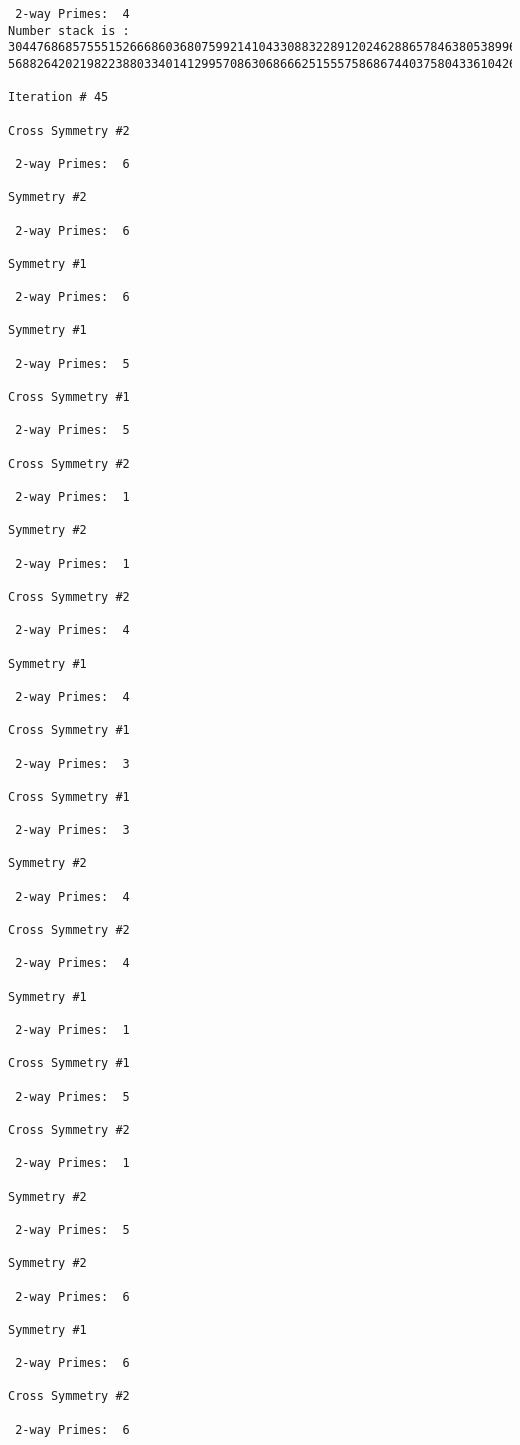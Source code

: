 {{{{\begin{verbatim}
 2-way Primes: 	4
Number stack is :
30447686857555152666860368075992141043308832289120246288657846380538996794608835958544046240163340857
56882642021982238803340141299570863068666251555758686744037580433610426404458595388064976998350836487

Iteration #	45

Cross Symmetry #2

 2-way Primes: 	6

Symmetry #2

 2-way Primes: 	6

Symmetry #1

 2-way Primes: 	6

Symmetry #1

 2-way Primes: 	5

Cross Symmetry #1

 2-way Primes: 	5

Cross Symmetry #2

 2-way Primes: 	1

Symmetry #2

 2-way Primes: 	1

Cross Symmetry #2

 2-way Primes: 	4

Symmetry #1

 2-way Primes: 	4

Cross Symmetry #1

 2-way Primes: 	3

Cross Symmetry #1

 2-way Primes: 	3

Symmetry #2

 2-way Primes: 	4

Cross Symmetry #2

 2-way Primes: 	4

Symmetry #1

 2-way Primes: 	1

Cross Symmetry #1

 2-way Primes: 	5

Cross Symmetry #2

 2-way Primes: 	1

Symmetry #2

 2-way Primes: 	5

Symmetry #2

 2-way Primes: 	6

Symmetry #1

 2-way Primes: 	6

Cross Symmetry #2

 2-way Primes: 	6


\end{verbatim}}}}}
